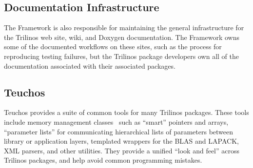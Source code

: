 \subsection{Documentation Infrastructure}

The Framework is also responsible for maintaining the general infrastructure for the Trilinos web site, wiki, and Doxygen documentation. The Framework owns some of the documented workflows on these sites, such as the process for reproducing testing failures, but the Trilinos package developers own all of the documentation associated with their associated packages.

\subsection{Teuchos}

Teuchos provides a suite of common tools for many Trilinos packages. These tools include memory management classes~\cite{bartlett2010} such as ``smart'' pointers and arrays, ``parameter lists'' for communicating hierarchical lists of parameters between library or application layers, templated wrappers for the BLAS and LAPACK, XML parsers, and other utilities. They provide a unified ``look and feel'' across Trilinos packages, and help avoid common programming mistakes.





